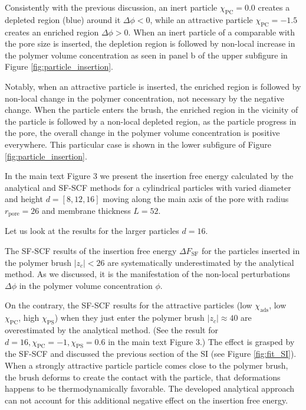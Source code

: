 \documentclass[10pt, a4paper]{article}
\begin{document}
\begin{multicols}{2}
Consistently with the previous discussion, an inert particle $\chi_{\textrm{PC}} = 0.0$ creates a depleted region (blue) around it $\Delta \phi < 0$, while an attractive particle $\chi_{\textrm{PC}} = -1.5$ creates an enriched region $\Delta \phi > 0$.
When an inert particle of a comparable with the pore size is inserted, the depletion region is followed by non-local increase in the polymer volume concentration as seen in panel b of the upper subfigure in Figure \ref{fig:particle_insertion}.

Notably, when an attractive particle is inserted, the enriched region is followed by non-local change in the polymer concentration, not necessary by the negative change.
When the particle enters the brush, the enriched region in the vicinity of the particle is followed by a non-local depleted region, as the particle progress in the pore, the overall change in the polymer volume concentration is positive everywhere.
This particular case is shown in the lower subfigure of Figure \ref{fig:particle_insertion}.

In the main text Figure 3 we present the insertion free energy calculated by the analytical and SF-SCF methods for a cylindrical particles with varied diameter and height $d=[8, 12, 16]$ moving along the main axis of the pore with radius $r_{\textrm{pore}} = 26$ and membrane thickness $L=52$.

Let us look at the results for the larger particles $d = 16$.

The SF-SCF results of the insertion free energy $\Delta F_{\textrm{SF}}$ for the particles inserted in the polymer brush $|z_c| < 26$ are systematically underestimated by the analytical method. 
As we discussed, it is the manifestation of the non-local perturbations $\Delta \phi$ in the polymer volume concentration $\phi$.

On the contrary, the SF-SCF results for the attractive particles (low $\chi_{\textrm{ads}}$, low $\chi_{\textrm{PC}}$, high $\chi_{\textrm{PS}}$) when they just enter the polymer brush $|z_c| \approx 40$ are overestimated by the analytical method.
(See the result for $d=16, \chi_{\textrm{PC}} = -1, \chi_{\textrm{PS}} = 0.6$ in the main text Figure 3.)
The effect is grasped by the SF-SCF and discussed the previous section of the SI (see Figure \ref{fig:fit_SI}).
When a strongly attractive particle particle comes close to the polymer brush, the brush deforms to create the contact with the particle, that deformations happens to be thermodynamically favorable.
The developed analytical approach can not account for this additional negative effect on the insertion free energy.

\end{multicols}
\end{document}
